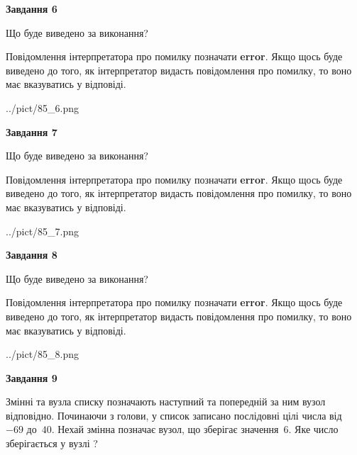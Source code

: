 \documentclass[12pt, ukrainian]{article}
\begin{document}
{\begin {large}
{\begin {center}\textbf{Завдання 6}\end {center}}\par
Що буде виведено за виконання?

Повідомлення інтерпретатора про помилку позначати \textbf{error}.
Якщо щось буде виведено до того, як інтерпретатор видасть повідомлення про помилку, 
то воно має вказуватись у відповіді. \par


\begin{center}
	{../pict/85_6.png}
\end{center}
\newpage

{\begin {center}\textbf{Завдання 7}\end {center}}\par
Що буде виведено за виконання?

Повідомлення інтерпретатора про помилку позначати \textbf{error}.
Якщо щось буде виведено до того, як інтерпретатор видасть повідомлення про помилку, 
то воно має вказуватись у відповіді. \par


\begin{center}
	{../pict/85_7.png}
\end{center}
\newpage

{\begin {center}\textbf{Завдання 8}\end {center}}\par
Що буде виведено за виконання?

Повідомлення інтерпретатора про помилку позначати \textbf{error}.
Якщо щось буде виведено до того, як інтерпретатор видасть повідомлення про помилку, 
то воно має вказуватись у відповіді. \par


\begin{center}
	{../pict/85_8.png}
\end{center}
\newpage

{\begin {center}\textbf{Завдання 9}\end {center}}\par
Змінні  та  вузла списку позначають наступний та попередній за ним вузол відповідно. Починаючи з голови, у список записано послідовні цілі числа від~$-69$ до~$40$. Нехай змінна  позначає вузол, що зберігає значення~$6$.
Яке число зберігається у вузлі  ?\par
\newpage


\end{large}}
\end{document}
